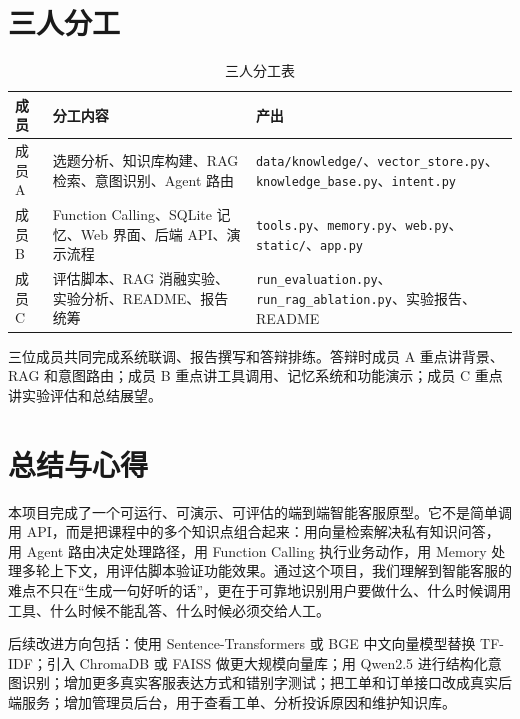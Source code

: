 \documentclass[12pt,a4paper]{ctexart}
\begin{document}
\section{三人分工}

\begin{table}[htbp]
\centering
\caption{三人分工表}
\begin{tabular}{p{2.5cm}p{6cm}p{5.5cm}}
\toprule
成员 & 分工内容 & 产出 \\
\midrule
成员 A & 选题分析、知识库构建、RAG 检索、意图识别、Agent 路由 & \texttt{data/knowledge/}、\texttt{vector\_store.py}、\texttt{knowledge\_base.py}、\texttt{intent.py} \\
成员 B & Function Calling、SQLite 记忆、Web 界面、后端 API、演示流程 & \texttt{tools.py}、\texttt{memory.py}、\texttt{web.py}、\texttt{static/}、\texttt{app.py} \\
成员 C & 评估脚本、RAG 消融实验、实验分析、README、报告统筹 & \texttt{run\_evaluation.py}、\texttt{run\_rag\_ablation.py}、实验报告、README \\
\bottomrule
\end{tabular}
\end{table}

三位成员共同完成系统联调、报告撰写和答辩排练。答辩时成员 A 重点讲背景、RAG 和意图路由；成员 B 重点讲工具调用、记忆系统和功能演示；成员 C 重点讲实验评估和总结展望。

\section{总结与心得}

本项目完成了一个可运行、可演示、可评估的端到端智能客服原型。它不是简单调用 API，而是把课程中的多个知识点组合起来：用向量检索解决私有知识问答，用 Agent 路由决定处理路径，用 Function Calling 执行业务动作，用 Memory 处理多轮上下文，用评估脚本验证功能效果。通过这个项目，我们理解到智能客服的难点不只在“生成一句好听的话”，更在于可靠地识别用户要做什么、什么时候调用工具、什么时候不能乱答、什么时候必须交给人工。

后续改进方向包括：使用 Sentence-Transformers 或 BGE 中文向量模型替换 TF-IDF；引入 ChromaDB 或 FAISS 做更大规模向量库；用 Qwen2.5 进行结构化意图识别；增加更多真实客服表达方式和错别字测试；把工单和订单接口改成真实后端服务；增加管理员后台，用于查看工单、分析投诉原因和维护知识库。
\end{document}
